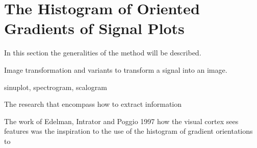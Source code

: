 \chapter{The Histogram of Oriented Gradients of Signal Plots}

In this section the generalities of the method will be described.

Image transformation and variants to transform a signal into an image.

sinuplot, spectrogram, scalogram


The research that encompass how to extract information 

The work of Edelman, Intrator and Poggio 1997 how the visual cortex sees features was the inspiration to the use of the histogram of gradient orientations to 

